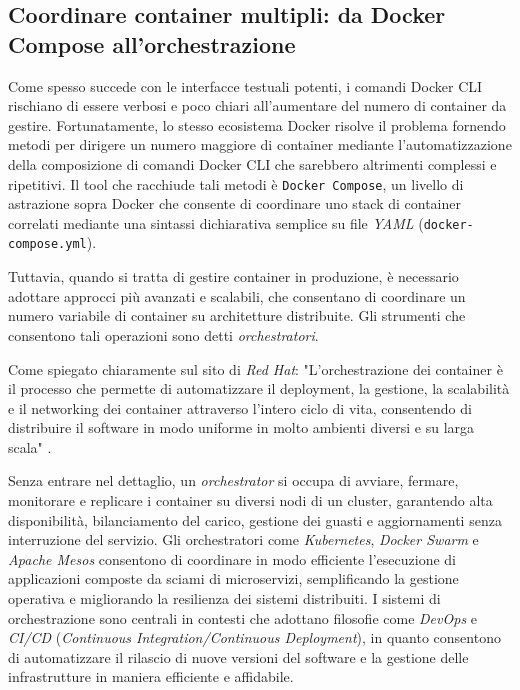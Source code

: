 \subsection{Coordinare container multipli: da Docker Compose all'orchestrazione}
Come spesso succede con le interfacce testuali potenti, i comandi Docker CLI rischiano di essere verbosi e poco chiari all'aumentare del numero di container da gestire. Fortunatamente, lo stesso ecosistema Docker risolve il problema fornendo metodi per dirigere un numero maggiore di container mediante l'automatizzazione della composizione di comandi Docker CLI che sarebbero altrimenti complessi e ripetitivi.
Il tool che racchiude tali metodi è \texttt{Docker Compose}, un livello di astrazione sopra Docker che consente di coordinare uno stack di container correlati mediante una sintassi dichiarativa semplice su file \emph{YAML} (\texttt{docker-compose.yml}).

Tuttavia, quando si tratta di gestire container in produzione, è necessario adottare approcci più avanzati e scalabili, che consentano di coordinare un numero variabile di container su architetture distribuite. Gli strumenti che consentono tali operazioni sono detti \emph{orchestratori}.

Come spiegato chiaramente sul sito di \emph{Red Hat}: "L'orchestrazione dei container è il processo che permette di automatizzare il deployment, la gestione, la scalabilità e il networking dei container attraverso l'intero ciclo di vita, consentendo di distribuire il software in modo uniforme in molto ambienti diversi e su larga scala" \cite{RedHat_Orchestration}.

Senza entrare nel dettaglio, un \emph{orchestrator} si occupa di avviare, fermare, monitorare e replicare i container su diversi nodi di un cluster, garantendo alta disponibilità, bilanciamento del carico, gestione dei guasti e aggiornamenti senza interruzione del servizio. Gli orchestratori come \emph{Kubernetes}, \emph{Docker Swarm} e \emph{Apache Mesos} consentono di coordinare in modo efficiente l'esecuzione di applicazioni composte da sciami di microservizi, semplificando la gestione operativa e migliorando la resilienza dei sistemi distribuiti.
I sistemi di orchestrazione sono centrali in contesti che adottano filosofie come \emph{DevOps} e \emph{CI/CD} (\emph{Continuous Integration/Continuous Deployment}), in quanto consentono di automatizzare il rilascio di nuove versioni del software e la gestione delle infrastrutture in maniera efficiente e affidabile.

